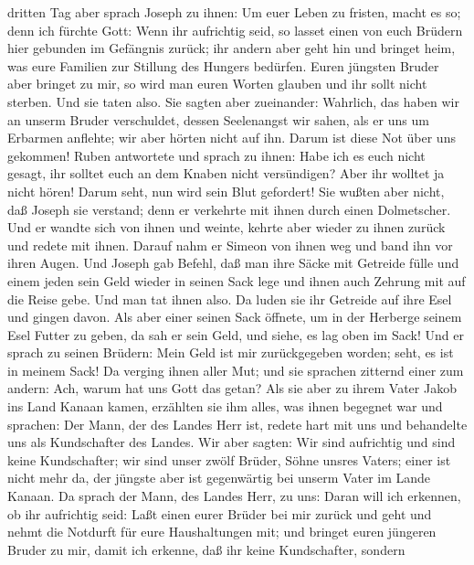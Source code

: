 dritten Tag aber sprach Joseph zu ihnen: Um euer Leben zu fristen, macht
es so; denn ich fürchte Gott:  Wenn ihr aufrichtig seid,
so lasset einen von euch Brüdern hier gebunden im Gefängnis zurück; ihr
andern aber geht hin und bringet heim, was eure Familien zur Stillung
des Hungers bedürfen.  Euren jüngsten Bruder aber bringet
zu mir, so wird man euren Worten glauben und ihr sollt nicht sterben.
Und sie taten also.  Sie sagten aber zueinander:
Wahrlich, das haben wir an unserm Bruder verschuldet, dessen Seelenangst
wir sahen, als er uns um Erbarmen anflehte; wir aber hörten nicht auf
ihn. Darum ist diese Not über uns gekommen!  Ruben
antwortete und sprach zu ihnen: Habe ich es euch nicht gesagt, ihr
solltet euch an dem Knaben nicht versündigen? Aber ihr wolltet ja nicht
hören! Darum seht, nun wird sein Blut gefordert!  Sie
wußten aber nicht, daß Joseph sie verstand; denn er verkehrte mit ihnen
durch einen Dolmetscher.  Und er wandte sich von ihnen
und weinte, kehrte aber wieder zu ihnen zurück und redete mit ihnen.
Darauf nahm er Simeon von ihnen weg und band ihn vor ihren Augen.
 Und Joseph gab Befehl, daß man ihre Säcke mit Getreide
fülle und einem jeden sein Geld wieder in seinen Sack lege und ihnen
auch Zehrung mit auf die Reise gebe.  Und man tat ihnen
also. Da luden sie ihr Getreide auf ihre Esel und gingen davon.
 Als aber einer seinen Sack öffnete, um in der Herberge
seinem Esel Futter zu geben, da sah er sein Geld, und siehe, es lag oben
im Sack!  Und er sprach zu seinen Brüdern: Mein Geld ist
mir zurückgegeben worden; seht, es ist in meinem Sack! Da verging ihnen
aller Mut; und sie sprachen zitternd einer zum andern: Ach, warum hat
uns Gott das getan?  Als sie aber zu ihrem Vater Jakob
ins Land Kanaan kamen, erzählten sie ihm alles, was ihnen begegnet war
und sprachen:  Der Mann, der des Landes Herr ist, redete
hart mit uns und behandelte uns als Kundschafter des Landes.
 Wir aber sagten: Wir sind aufrichtig und sind keine
Kundschafter;  wir sind unser zwölf Brüder, Söhne unsres
Vaters; einer ist nicht mehr da, der jüngste aber ist gegenwärtig bei
unserm Vater im Lande Kanaan.  Da sprach der Mann, des
Landes Herr, zu uns: Daran will ich erkennen, ob ihr aufrichtig seid:
Laßt einen eurer Brüder bei mir zurück und geht und nehmt die Notdurft
für eure Haushaltungen mit;  und bringet euren jüngeren
Bruder zu mir, damit ich erkenne, daß ihr keine Kundschafter, sondern
